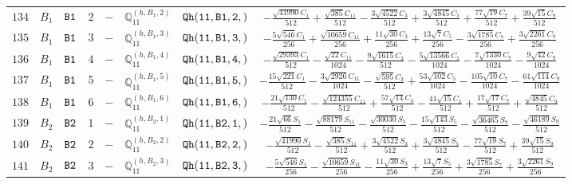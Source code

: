 \documentclass[fleqn,8pt]{jsarticle}
\begin{document}
\begin{table}[ht!]
\begin{center}
\begin{tabular}{cccccccc}
$ 134 $ & $ B_{1} $ & $ {\tt B1} $ & $ 2 $ & $ - $ & $ \mathbb{Q}_{11}^{(h,B_{1},2)} $ & $ {\tt Qh(11,B1,2,)} $ & $ - \frac{\sqrt{41990} C_{1}}{512} + \frac{\sqrt{385} C_{11}}{512} - \frac{3 \sqrt{4522} C_{3}}{512} + \frac{3 \sqrt{4845} C_{5}}{512} + \frac{77 \sqrt{19} C_{7}}{512} + \frac{39 \sqrt{15} C_{9}}{512} $ \\
$ 135 $ & $ B_{1} $ & $ {\tt B1} $ & $ 3 $ & $ - $ & $ \mathbb{Q}_{11}^{(h,B_{1},3)} $ & $ {\tt Qh(11,B1,3,)} $ & $ - \frac{5 \sqrt{546} C_{1}}{256} + \frac{\sqrt{10659} C_{11}}{256} + \frac{11 \sqrt{30} C_{3}}{256} + \frac{13 \sqrt{7} C_{5}}{256} - \frac{3 \sqrt{1785} C_{7}}{256} + \frac{3 \sqrt{2261} C_{9}}{256} $ \\
$ 136 $ & $ B_{1} $ & $ {\tt B1} $ & $ 4 $ & $ - $ & $ \mathbb{Q}_{11}^{(h,B_{1},4)} $ & $ {\tt Qh(11,B1,4,)} $ & $ - \frac{\sqrt{29393} C_{1}}{512} - \frac{\sqrt{22} C_{11}}{1024} - \frac{9 \sqrt{1615} C_{3}}{512} - \frac{5 \sqrt{13566} C_{5}}{1024} - \frac{7 \sqrt{1330} C_{7}}{1024} - \frac{9 \sqrt{42} C_{9}}{1024} $ \\
$ 137 $ & $ B_{1} $ & $ {\tt B1} $ & $ 5 $ & $ - $ & $ \mathbb{Q}_{11}^{(h,B_{1},5)} $ & $ {\tt Qh(11,B1,5,)} $ & $ - \frac{15 \sqrt{221} C_{1}}{512} - \frac{3 \sqrt{2926} C_{11}}{1024} - \frac{\sqrt{595} C_{3}}{512} + \frac{53 \sqrt{102} C_{5}}{1024} - \frac{105 \sqrt{10} C_{7}}{1024} - \frac{61 \sqrt{114} C_{9}}{1024} $ \\
$ 138 $ & $ B_{1} $ & $ {\tt B1} $ & $ 6 $ & $ - $ & $ \mathbb{Q}_{11}^{(h,B_{1},6)} $ & $ {\tt Qh(11,B1,6,)} $ & $ - \frac{21 \sqrt{130} C_{1}}{512} - \frac{\sqrt{124355} C_{11}}{512} + \frac{57 \sqrt{14} C_{3}}{512} - \frac{41 \sqrt{15} C_{5}}{512} + \frac{17 \sqrt{17} C_{7}}{512} + \frac{\sqrt{4845} C_{9}}{512} $ \\
$ 139 $ & $ B_{2} $ & $ {\tt B2} $ & $ 1 $ & $ - $ & $ \mathbb{Q}_{11}^{(h,B_{2},1)} $ & $ {\tt Qh(11,B2,1,)} $ & $ - \frac{21 \sqrt{66} S_{1}}{512} - \frac{\sqrt{88179} S_{11}}{512} - \frac{\sqrt{30030} S_{3}}{512} - \frac{15 \sqrt{143} S_{5}}{512} - \frac{\sqrt{36465} S_{7}}{512} - \frac{\sqrt{46189} S_{9}}{512} $ \\
$ 140 $ & $ B_{2} $ & $ {\tt B2} $ & $ 2 $ & $ - $ & $ \mathbb{Q}_{11}^{(h,B_{2},2)} $ & $ {\tt Qh(11,B2,2,)} $ & $ - \frac{\sqrt{41990} S_{1}}{512} - \frac{\sqrt{385} S_{11}}{512} + \frac{3 \sqrt{4522} S_{3}}{512} + \frac{3 \sqrt{4845} S_{5}}{512} - \frac{77 \sqrt{19} S_{7}}{512} + \frac{39 \sqrt{15} S_{9}}{512} $ \\
$ 141 $ & $ B_{2} $ & $ {\tt B2} $ & $ 3 $ & $ - $ & $ \mathbb{Q}_{11}^{(h,B_{2},3)} $ & $ {\tt Qh(11,B2,3,)} $ & $ - \frac{5 \sqrt{546} S_{1}}{256} - \frac{\sqrt{10659} S_{11}}{256} - \frac{11 \sqrt{30} S_{3}}{256} + \frac{13 \sqrt{7} S_{5}}{256} + \frac{3 \sqrt{1785} S_{7}}{256} + \frac{3 \sqrt{2261} S_{9}}{256} $ \\

\end{tabular}
\end{center}
\end{table}
\end{document}
